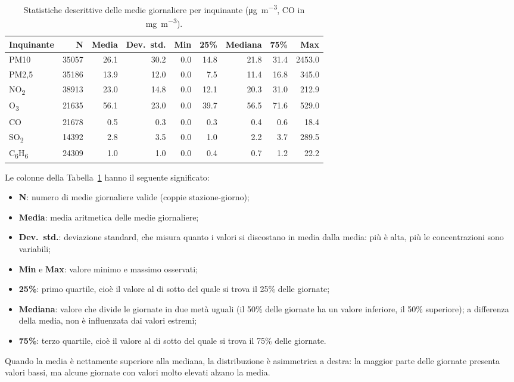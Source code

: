 \documentclass[11pt]{report}
\newcommand{\ugm}{\si{\micro\gram\per\cubic\metre}}
\newcommand{\mgm}{\si{\milli\gram\per\cubic\metre}}
\begin{document}
\begin{table}[H]
  \centering
  \caption{Statistiche descrittive delle medie giornaliere per inquinante (\ugm, CO in \mgm).}
  \label{tab:describe}
  \small
  \begin{tabular}{l r r r r r r r r}
    \toprule
    \textbf{Inquinante} & \textbf{N} & \textbf{Media} & \textbf{Dev.\ std.} & \textbf{Min} & \textbf{25\%} & \textbf{Mediana} & \textbf{75\%} & \textbf{Max} \\
    \midrule
    PM10 & \num{35057} & \num{26.1} & \num{30.2} & \num{0.0} & \num{14.8} & \num{21.8} & \num{31.4} & \num{2453.0} \\
    PM2,5 & \num{35186} & \num{13.9} & \num{12.0} & \num{0.0} & \num{7.5} & \num{11.4} & \num{16.8} & \num{345.0} \\
    NO\textsubscript{2} & \num{38913} & \num{23.0} & \num{14.8} & \num{0.0} & \num{12.1} & \num{20.3} & \num{31.0} & \num{212.9} \\
    O\textsubscript{3} & \num{21635} & \num{56.1} & \num{23.0} & \num{0.0} & \num{39.7} & \num{56.5} & \num{71.6} & \num{529.0} \\
    CO & \num{21678} & \num{0.5} & \num{0.3} & \num{0.0} & \num{0.3} & \num{0.4} & \num{0.6} & \num{18.4} \\
    SO\textsubscript{2} & \num{14392} & \num{2.8} & \num{3.5} & \num{0.0} & \num{1.0} & \num{2.2} & \num{3.7} & \num{289.5} \\
    C\textsubscript{6}H\textsubscript{6} & \num{24309} & \num{1.0} & \num{1.0} & \num{0.0} & \num{0.4} & \num{0.7} & \num{1.2} & \num{22.2} \\
    \bottomrule
  \end{tabular}
\end{table}

Le colonne della Tabella~\ref{tab:describe} hanno il seguente significato:
\begin{itemize}
  \item \textbf{N}: numero di medie giornaliere valide (coppie stazione-giorno);
  \item \textbf{Media}: media aritmetica delle medie giornaliere;
  \item \textbf{Dev.\ std.}: deviazione standard, che misura quanto i valori si
        discostano in media dalla media: più è alta, più le concentrazioni sono variabili;
  \item \textbf{Min} e \textbf{Max}: valore minimo e massimo osservati;
  \item \textbf{25\%}: primo quartile, cioè il valore al di sotto del quale si
        trova il 25\% delle giornate;
  \item \textbf{Mediana}: valore che divide le giornate in due metà uguali
        (il 50\% delle giornate ha un valore inferiore, il 50\% superiore); a
        differenza della media, non è influenzata dai valori estremi;
  \item \textbf{75\%}: terzo quartile, cioè il valore al di sotto del quale si
        trova il 75\% delle giornate.
\end{itemize}
Quando la media è nettamente superiore alla mediana, la distribuzione è
asimmetrica a destra: la maggior parte delle giornate presenta valori bassi, ma
alcune giornate con valori molto elevati alzano la media.
\end{document}
